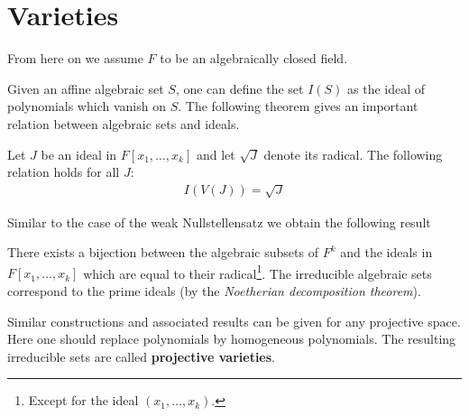 \section{Varieties}

	From here on we assume $F$ to be an algebraically closed field.


	Given an affine algebraic set $S$, one can define the set $I(S)$ as the ideal of polynomials which vanish on $S$. The following theorem gives an important relation between algebraic sets and ideals.
	\begin{theorem}
		Let $J$ be an ideal in $F[x_1, \ldots, x_k]$ and let $\sqrt{J}$ denote its radical. The following relation holds for all $J$:
		\begin{gather}
			I(V(J)) = \sqrt{J}
		\end{gather}
	\end{theorem}
	Similar to the case of the weak Nullstellensatz we obtain the following result
	\begin{result}
		There exists a bijection between the algebraic subsets of $F^k$ and the ideals in $F[x_1, \ldots, x_k]$ which are equal to their radical\footnote{Except for the ideal $(x_1, \ldots, x_k)$.}. The irreducible algebraic sets correspond to the prime ideals (by the \textit{Noetherian decomposition theorem}).
	\end{result}

	\begin{remark}
		Similar constructions and associated results can be given for any projective space. Here one should replace polynomials by homogeneous polynomials. The resulting irreducible sets are called \textbf{projective varieties}.
	\end{remark}


